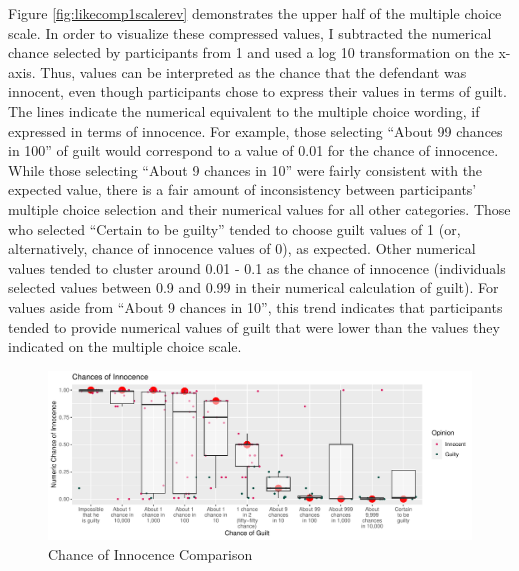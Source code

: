 \documentclass[print]{nuthesis}
\begin{document}
Figure \ref{fig:likecomp1scalerev} demonstrates the upper half of the multiple choice scale.
In order to visualize these compressed values, I subtracted the numerical chance selected by participants from 1 and used a log 10 transformation on the x-axis.
Thus, values can be interpreted as the chance that the defendant was innocent, even though participants chose to express their values in terms of guilt.
The lines indicate the numerical equivalent to the multiple choice wording, if expressed in terms of innocence.
For example, those selecting ``About 99 chances in 100'' of guilt would correspond to a value of 0.01 for the chance of innocence.
While those selecting ``About 9 chances in 10'' were fairly consistent with the expected value, there is a fair amount of inconsistency between participants' multiple choice selection and their numerical values for all other categories.
Those who selected ``Certain to be guilty'' tended to choose guilt values of 1 (or, alternatively, chance of innocence values of 0), as expected.
Other numerical values tended to cluster around 0.01 - 0.1 as the chance of innocence (individuals selected values between 0.9 and 0.99 in their numerical calculation of guilt).
For values aside from ``About 9 chances in 10'', this trend indicates that participants tended to provide numerical values of guilt that were lower than the values they indicated on the multiple choice scale.

\begin{figure}

{\centering \includegraphics[width=\linewidth]{thesis_files/figure-latex/likecomp2-1} 

}

\caption{Chance of Innocence Comparison}\label{fig:likecomp2}
\end{figure}
\end{document}
